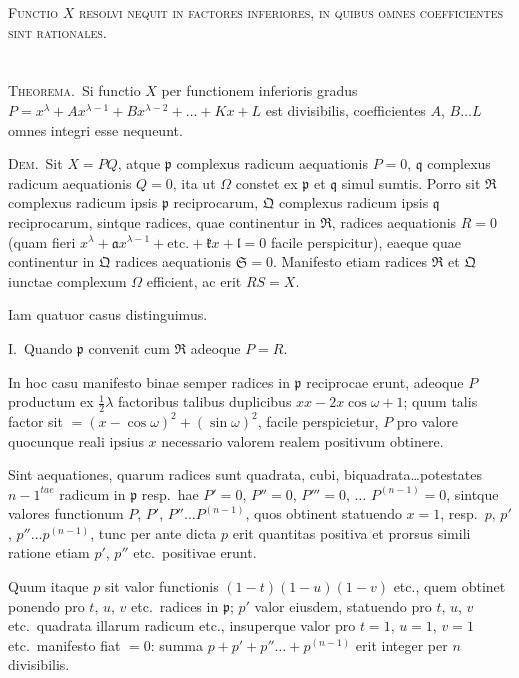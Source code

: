 \documentclass[12pt,a4paper]{article}
\theoremstyle{plain}
\theoremstyle{definition}
\theoremstyle{remark}
\begin{document}
\textsc{Functio $X$ resolvi nequit in factores inferiores, in quibus omnes coefficientes sint rationales.}

\section{}

\textsc{Theorema.}\ Si functio $X$ per functionem inferioris gradus $P=x^\lambda+Ax^{\lambda-1}+Bx^{\lambda-2}+\ldots+Kx+L$ est divisibilis, coefficientes $A$, $B\ldots L$ omnes integri esse nequeunt.

\textsc{Dem.}\ Sit $X=PQ$, atque $\mathfrak{p}$ complexus radicum aequationis $P=0$, $\mathfrak{q}$ complexus radicum aequationis $Q=0$, ita ut $\Omega$ constet ex $\mathfrak{p}$ et $\mathfrak{q}$ simul sumtis. Porro sit $\mathfrak{R}$ complexus radicum ipsis $\mathfrak{p}$ reciprocarum, $\mathfrak{Q}$ complexus radicum ipsis $\mathfrak{q}$ reciprocarum, sintque radices, quae continentur in $\mathfrak{R}$, radices aequationis $R=0$ (quam fieri $x^\lambda+\mathfrak{a}x^{\lambda-1}+\text{etc.}+\mathfrak{k}x+\mathfrak{l}=0$ facile perspicitur), eaeque quae continentur in $\mathfrak{Q}$ radices aequationis $\mathfrak{S}=0$. Manifesto etiam radices $\mathfrak{R}$ et $\mathfrak{Q}$ iunctae complexum $\Omega$ efficient, ac erit $RS=X$.

Iam quatuor casus distinguimus.

\textsc{I.}\ Quando $\mathfrak{p}$ convenit cum $\mathfrak{R}$ adeoque $P=R$.

In hoc casu manifesto binae semper radices in $\mathfrak{p}$ reciprocae erunt, adeoque $P$ productum ex $\frac{1}{2}\lambda$ factoribus talibus duplicibus $xx-2x\cos\omega+1$; quum talis factor sit $=(x-\cos\omega)^2+(\sin\omega)^2$, facile perspicietur, $P$ pro valore quocunque reali ipsius $x$ necessario valorem realem positivum obtinere.

Sint aequationes, quarum radices sunt quadrata, cubi, biquadrata\ldots potestates $n-1^{tae}$ radicum in $\mathfrak{p}$ resp.\ hae $P'=0$, $P''=0$, $P'''=0$, $\ldots$ $P^{(n-1)}=0$, sintque valores functionum $P$, $P'$, $P''\ldots P^{(n-1)}$, quos obtinent statuendo $x=1$, resp.\ $p$, $p'$, $p''\ldots p^{(n-1)}$, tunc per ante dicta $p$ erit quantitas positiva et prorsus simili ratione etiam $p'$, $p''$ etc.\ positivae erunt.

Quum itaque $p$ sit valor functionis $(1-t)(1-u)(1-v)$ etc., quem obtinet ponendo pro $t$, $u$, $v$ etc.\ radices in $\mathfrak{p}$; $p'$ valor eiusdem, statuendo pro $t$, $u$, $v$ etc.\ quadrata illarum radicum etc., insuperque valor pro $t=1$, $u=1$, $v=1$ etc.\ manifesto fiat $=0$: summa $p+p'+p''\ldots+p^{(n-1)}$ erit integer per $n$ divisibilis.
\end{document}
